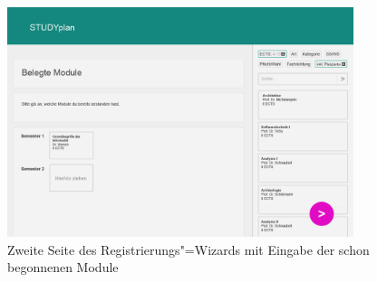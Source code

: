 \begin{figure}
	\caption{Zweite Seite des Registrierungs"=\gls{Wizard}s mit Eingabe der schon begonnenen Module}
	\label{fig:gui-registrierung-2}
	\centering
	\includegraphics[width=0.9\textwidth]{../GUI/ergebnisse/registrierung-2.png}
\end{figure}

